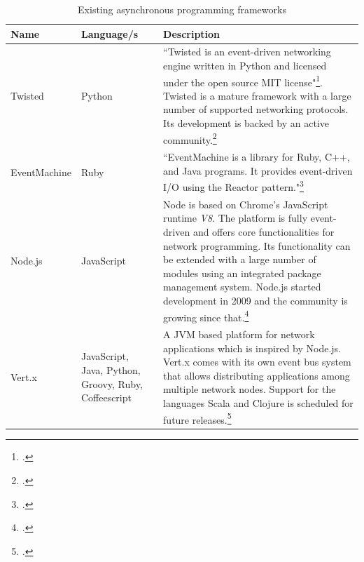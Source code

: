 \FloatBarrier
\begin{savenotes} %
\begin{table}
\begin{tabular*}{\textwidth}{p{} p{} p{}}
\toprule
\textbf{Name} & \textbf{Language/s} & \textbf{Description} \\
\midrule 
Twisted			& Python			& ``Twisted is an event-driven networking engine written in 
									  Python and licensed under the open source MIT license"\footcite[Cf.]{Twisted_2012}.
									  Twisted is a mature framework with a large number of supported networking
									  protocols. Its development is backed by an active
									  community.\footcite[Cf.][12]{fettig_2005}
									  \\
									  
EventMachine 	& Ruby    			& ``EventMachine is a library for Ruby, C++, and Java
									  programs. It provides event-driven I/O using the Reactor 
									  pattern."\footcite[]{eventmachine_2012}\\

Node.js			& JavaScript		& Node is based on Chrome's JavaScript runtime \textit{V8}.
									  The platform is fully event-driven and offers core
									  functionalities for network programming. Its functionality
									  can be extended with a large number of modules using an
									  integrated package management system.
									  Node.js started development in 2009 and the community
									  is growing since that.\footcite[Cf.][]{Mashtable_2011}\\
									  
Vert.x			& JavaScript, Java, Python, Groovy, Ruby, Coffeescript		
									& A JVM based platform for network applications which is
									  inspired by Node.js. Vert.x comes with its own event
									  bus system that allows distributing applications
									  among multiple network nodes. Support for the languages
									  Scala and Clojure is scheduled for future releases.\footcite[Cf.][]{vertx_2012}\\
\bottomrule 
\end{tabular*}
  \caption{Existing asynchronous programming frameworks}
  \label{tab:existing_frameworks}
\end{table}
\end{savenotes}


